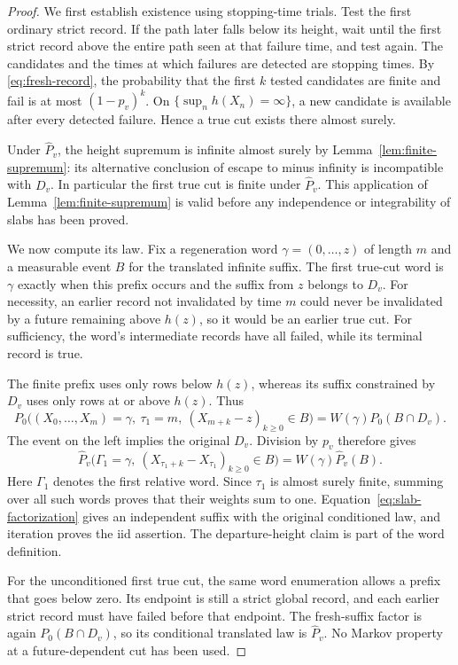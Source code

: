 \begin{proof}
We first establish existence using stopping-time trials.  Test the first
ordinary strict record.  If the path later falls below its height, wait
until the first strict record above the entire path seen at that failure
time, and test again.  The candidates and the times at which failures are
detected are stopping times.  By \eqref{eq:fresh-record}, the probability
that the first $k$ tested candidates are finite and fail is at most
$(1-p_v)^k$.  On $\{\sup_n h(X_n)=\infty\}$, a new candidate is available
after every detected failure.  Hence a true cut exists there almost surely.

Under $\widehat P_v$, the height supremum is infinite almost surely by
Lemma~\ref{lem:finite-supremum}: its alternative conclusion of
escape to minus infinity is incompatible with $D_v$.  In particular the
first true cut is finite under $\widehat P_v$.  This application of
Lemma~\ref{lem:finite-supremum} is
valid before any independence or integrability of slabs has been proved.

We now compute its law.  Fix a regeneration word
$\gamma=(0,\ldots,z)$ of length $m$ and a measurable event $B$ for the
translated infinite suffix.  The first true-cut word is $\gamma$ exactly
when this prefix occurs and the suffix from $z$ belongs to $D_v$.
For necessity, an earlier record not invalidated by time $m$ could never
be invalidated by a future remaining above $h(z)$, so it would be an
earlier true cut.  For sufficiency, the word's intermediate records have
all failed, while its terminal record is true.

The finite prefix uses only rows below $h(z)$, whereas its suffix
constrained by $D_v$ uses only rows at or above $h(z)$.  Thus
\[
 P_0\big((X_0,\ldots,X_m)=\gamma,\ \tau_1=m,
         \ (X_{m+k}-z)_{k\ge0}\in B\big)
       =W(\gamma)P_0(B\cap D_v).
\]
The event on the left implies the original $D_v$.  Division by $p_v$
therefore gives
\begin{equation}\label{eq:slab-factorization}
 \widehat P_v\big(\Gamma_1=\gamma,
               \ (X_{\tau_1+k}-X_{\tau_1})_{k\ge0}\in B\big)
          =W(\gamma)\widehat P_v(B).
\end{equation}
Here $\Gamma_1$ denotes the first relative word.  Since $\tau_1$ is almost
surely finite, summing over all such words proves that their weights sum
to one.  Equation~\eqref{eq:slab-factorization} gives an independent suffix
with the original conditioned law, and iteration proves the iid
assertion.  The departure-height claim is part of the word definition.

For the unconditioned first true cut, the same word enumeration allows a
prefix that goes below zero.  Its endpoint is still a strict global
record, and each earlier strict record must have failed before that
endpoint.  The fresh-suffix factor is again $P_0(B\cap D_v)$, so its
conditional translated law is $\widehat P_v$.  No Markov property at a
future-dependent cut has been used.
\end{proof}


